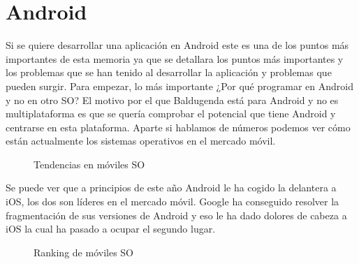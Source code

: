 \section{Android}
\label{secc:android}
Si se quiere desarrollar una aplicación en Android este es una de los puntos más importantes de esta memoria ya que se detallara los puntos más importantes y los problemas que se han tenido al desarrollar la aplicación y problemas que pueden surgir.
Para empezar, lo más importante ¿Por qué programar en Android y no en otro SO?
El motivo por el que Baldugenda está para Android  y no es multiplataforma es que se quería 
comprobar el potencial que tiene Android y centrarse en esta plataforma.
Aparte si hablamos de números podemos ver cómo están actualmente los sistemas operativos en el mercado móvil\cite{Tendencias}.

\begin{figure}[H] 
  \begin{center} 
    \caption{Tendencias en móviles SO} 
    \label{fig:TendenciasSO} 
  \end{center} 
\end{figure}

Se puede ver que a principios de este año Android le ha cogido la delantera a iOS, los dos son líderes en el mercado móvil.
Google ha conseguido resolver la fragmentación de sus versiones de Android y eso le ha dado dolores de cabeza a iOS la cual ha pasado a ocupar el segundo lugar.
\newpage
\begin{figure}[H] 
  \begin{center} 
    \caption{Ranking de móviles SO} 
    \label{fig:RankingSO} 
  \end{center} 
\end{figure}


